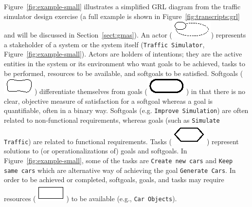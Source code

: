 Figure~\ref{fig:example-small} illustrates a simplified GRL diagram from the traffic simulator design exercise (a full example is shown in Figure~\ref{fig:transcripts:grl} and will be discussed in Section~\ref{sect:gmas}). %
An actor (\includegraphics[scale=1]{img/actor}) represents a stakeholder of a system or the system itself (\texttt{Traffic Simulator}, Figure~\ref{fig:example-small}). Actors are holders of intentions; they are the active entities in the system or its environment who want goals to be achieved, tasks to be performed, resources to be available, and softgoals to be satisfied. Softgoals (\includegraphics[scale=1]{img/softgoal}) differentiate themselves from goals (\includegraphics[scale=1]{img/goal}) in that there is no clear, objective measure of satisfaction for a softgoal whereas a goal is quantifiable, often in a binary way. Softgoals (e.g. \texttt{Improve Simulation}) are often related to non-functional requirements, whereas goals (such as  \texttt{Simulate Traffic}) are related to functional requirements. Tasks (\includegraphics[scale=1]{img/task}) represent solutions to (or operationalizations of) goals and softgoals. In Figure~\ref{fig:example-small}, some of the tasks are  \texttt{Create new cars} and \texttt{Keep same cars} which are alternative way of achieving the goal \texttt{Generate Cars}. In order to be achieved or completed, softgoals, goals, and tasks may require resources (\includegraphics[scale=1]{img/resource}) to be available (e.g., \texttt{Car Objects}). 

